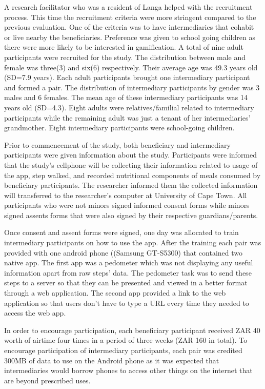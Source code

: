 A research facilitator who was a resident of Langa helped with the recruitment process. This time the recruitment criteria were more stringent compared to the previous evaluation. One of the criteria was to have intermediaries that cohabit or live nearby the beneficiaries. Preference was given to school going children as there were more likely to be interested in gamification. A total of nine adult participants were recruited for the study. The distribution between male and female was three(3) and six(6) respectively. Their average age was 49.3 years old (SD=7.9 years). Each adult participants brought one intermediary participant and formed a pair. The distribution of intermediary participants by gender was 3 males and 6 females. The mean age of these intermediary participants was 14 years old (SD=4.3).  Eight adults  were relatives/familial related to intermediary participants while the remaining adult was just a tenant of her intermediaries' grandmother. Eight intermediary participants were school-going children.

Prior to commencement of the study, both beneficiary and intermediary participants were given information about the study. Participants were informed that the study's cellphone will be collecting their information related to usage of the app, step walked,  and recorded nutritional components of meals consumed by beneficiary participants. The researcher informed them the collected information will transferred to the researcher's computer at University of Cape Town. All participants who were not minors signed informed consent forms while minors signed assents forms that were also signed by their respective guardians/parents.

Once consent and assent forms were signed, one day was allocated to train intermediary participants on how to use the app. After the training each pair was provided with one android phone ((Samsung
GT-S5300) that contained two native app. The first app was a pedometer which was not displaying any useful information apart from raw steps' data. The pedometer task was to send these steps to a server so that they can be presented  and viewed in a better format through a web application. The second app provided a link to the web application so that users don't have to type a URL every time they needed to access the web app.

In order to encourage participation, each beneficiary participant received ZAR 40 worth of airtime four times in a period of three weeks (ZAR 160 in total). To encourage participation of intermediary participants, each pair was credited 300MB of data to use on the Android phone as it was expected that intermediaries would borrow phones to access other things on the internet that are beyond prescribed uses.

